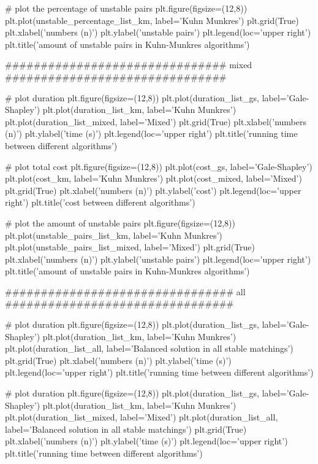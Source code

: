 \documentclass[14pt]{extarticle}
\begin{document}
\begin{python}
    # plot the percentage of unstable pairs
    plt.figure(figsize=(12,8))
    plt.plot(unstable_percentage_list_km, label='Kuhn Munkres')
    plt.grid(True)
    plt.xlabel('numbers (n)')
    plt.ylabel('unstable pairs')
    plt.legend(loc='upper right')
    plt.title('amount of unstable pairs in Kuhn-Munkres algorithms') 
    
    ############################### mixed ###############################

    # plot duration 
    plt.figure(figsize=(12,8))
    plt.plot(duration_list_gs, label='Gale-Shapley')
    plt.plot(duration_list_km, label='Kuhn Munkres')
    plt.plot(duration_list_mixed, label='Mixed')
    plt.grid(True)
    plt.xlabel('numbers (n)')
    plt.ylabel('time (s)')
    plt.legend(loc='upper right')
    plt.title('running time between different algorithms') 

    # plot total cost
    plt.figure(figsize=(12,8))
    plt.plot(cost_gs, label='Gale-Shapley')
    plt.plot(cost_km, label='Kuhn Munkres')
    plt.plot(cost_mixed, label='Mixed')
    plt.grid(True)
    plt.xlabel('numbers (n)')
    plt.ylabel('cost')
    plt.legend(loc='upper right')
    plt.title('cost between different algorithms')  

    # plot the amount of unstable pairs
    plt.figure(figsize=(12,8))
    plt.plot(unstable_pairs_list_km, label='Kuhn Munkres')
    plt.plot(unstable_pairs_list_mixed, label='Mixed')
    plt.grid(True)
    plt.xlabel('numbers (n)')
    plt.ylabel('unstable pairs')
    plt.legend(loc='upper right')
    plt.title('amount of unstable pairs in Kuhn-Munkres algorithms') 
    
    ################################ all ################################
    
    # plot duration 
    plt.figure(figsize=(12,8))
    plt.plot(duration_list_gs, label='Gale-Shapley')
    plt.plot(duration_list_km, label='Kuhn Munkres')
    plt.plot(duration_list_all, label='Balanced solution in all stable matchings')
    plt.grid(True)
    plt.xlabel('numbers (n)')
    plt.ylabel('time (s)')
    plt.legend(loc='upper right')
    plt.title('running time between different algorithms') 

    # plot duration 
    plt.figure(figsize=(12,8))
    plt.plot(duration_list_gs, label='Gale-Shapley')
    plt.plot(duration_list_km, label='Kuhn Munkres')
    plt.plot(duration_list_mixed, label='Mixed')
    plt.plot(duration_list_all, label='Balanced solution in all stable matchings')
    plt.grid(True)
    plt.xlabel('numbers (n)')
    plt.ylabel('time (s)')
    plt.legend(loc='upper right')
    plt.title('running time between different algorithms') 


\end{python}
\end{document}
